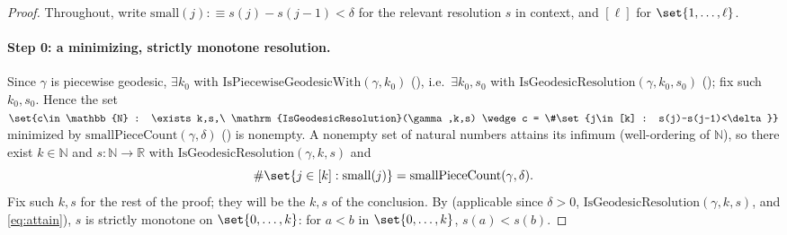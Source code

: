 \begin{proof}
  Throughout, write $\mathrm{small}(j) :\equiv s(j)-s(j-1)<\delta$ for the relevant resolution $s$
  in context, and $[\ell]$ for $\set{1,\dots,\ell}$.

  \paragraph{Step 0: a minimizing, strictly monotone resolution.} Since $\gamma$ is piecewise
  geodesic, $\exists k_0$ with $\mathrm{IsPiecewiseGeodesicWith}(\gamma,k_0)$
  (), i.e.\ $\exists k_0,s_0$ with
  $\mathrm{IsGeodesicResolution}(\gamma,k_0,s_0)$ (); fix such
  $k_0,s_0$. Hence the set
  $\set{c\in\mathbb{N} : \exists k,s,\ \mathrm{IsGeodesicResolution}(\gamma,k,s) \wedge c =
  \#\set{j\in[k] : s(j)-s(j-1)<\delta}}$ minimized by $\mathrm{smallPieceCount}(\gamma,\delta)$
  () is nonempty. A nonempty set of natural numbers attains its infimum
  (well-ordering of $\mathbb{N}$), so there exist $k\in\mathbb{N}$ and $s\colon\mathbb{N}\to\mathbb{R}$
  with $\mathrm{IsGeodesicResolution}(\gamma,k,s)$ and
  \begin{equation}
    \label{eq:attain}
    \#\set{j\in[k] : \mathrm{small}(j)} = \mathrm{smallPieceCount}(\gamma,\delta)
    .
  \end{equation}
  Fix such $k,s$ for the rest of the proof; they will be the $k,s$ of the conclusion. By
   (applicable since $\delta>0$, $\mathrm{IsGeodesicResolution}
  (\gamma,k,s)$, and \eqref{eq:attain}), $s$ is strictly monotone on $\set{0,\dots,k}$: for
  $a<b$ in $\set{0,\dots,k}$, $s(a)<s(b)$.


\end{proof}
